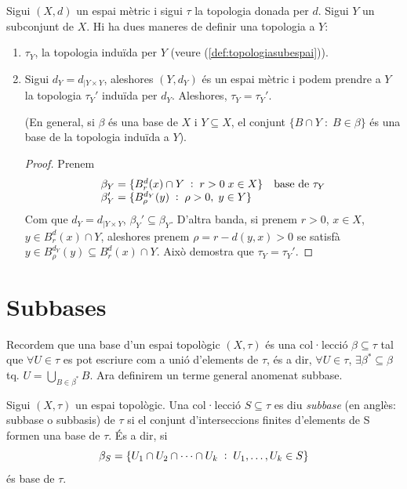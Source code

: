 \documentclass[../main.tex]{subfiles}
\begin{document}
\begin{ej}
Sigui $(X,d)$ un espai mètric i sigui $\tau$ la topologia donada per $d$. Sigui $Y$ un subconjunt de $X$. Hi ha dues maneres de definir una topologia a $Y$:
\begin{enumerate}[(1)]
    \item $\tau_Y$, la topologia induïda per $Y$ (veure (\ref{def:topologiasubespai})).
    \item Sigui $d_Y = d_{|Y\times Y}$, aleshores $(Y,d_Y)$ és un espai mètric i podem prendre a $Y$ la topologia $\tau_Y'$ induïda per $d_Y$. Aleshores, $\tau_Y = \tau_Y'$.
    
    (En general, si $\beta$ és una base de $X$ i $Y\subseteq X$, el conjunt $\{B\cap Y\;:\;B\in \beta\}$ és una base de la topologia induïda a $Y$).
    \begin{proof}
    Prenem
    \begin{equation}
        \notag
        \begin{array}{ll}
            \beta_Y = \{B_r^d(x)\cap Y\;:\; r>0\;x\in X\}\quad \text{base de $\tau_Y$} \\
            \beta_Y' = \{B_\rho^{d_Y}(y)\;:\;\rho>0,\;y\in Y\}
        \end{array}
    \end{equation}
    Com que $d_Y = d_{|Y\times Y}$, $\beta_Y'\subseteq \beta_Y$. D'altra banda, si prenem $r>0$, $x\in X$, $y\in B_r^d(x)\cap Y$, aleshores prenem $\rho = r-d(y,x)>0$ se satisfà $y\in B_\rho^{d_Y}(y)\subseteq B_r^d(x)\cap Y$. Això demostra que $\tau_Y = \tau_Y'$.
    \end{proof}
\end{enumerate}
\end{ej}

\section{Subbases}

Recordem que una base d'un espai topològic $(X,\tau)$ és una col·lecció $\beta\subseteq\tau$ tal que $\forall U\in\tau$ es pot escriure com a unió d'elements de $\tau$, és a dir, $\forall U\in\tau$, $\exists\beta^*\subseteq\beta$ tq. $U = \bigcup_{B\in\beta^*}B$. Ara definirem un terme general anomenat subbase.

\begin{defi}[Subbase]
\label{def:subbase} Sigui $(X,\tau)$ un espai topològic. Una col·lecció $S\subseteq\tau$ es diu \textit{subbase} (en anglès: subbase o subbasis) de $\tau$ si el conjunt d'interseccions finites d'elements de S formen una base de $\tau$. És a dir, si 
\begin{equation}
    \notag
    \beta_S = \{U_1\cap U_2\cap\cdots\cap U_k\;:\;U_1,\ldots,U_k\in S\}
\end{equation}
és base de $\tau$.
\end{defi}
\end{document}
